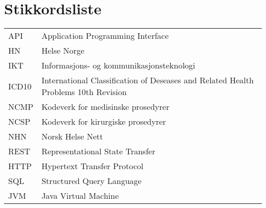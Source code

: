 \section{Stikkordsliste}

\begin{table}[H]
\begin{tabular}{l l} 
 
API & Application Programming Interface\\
  
HN & Helse Norge\\
IKT & Informasjons- og kommunikasjonsteknologi\\
ICD10 & International Classification of Deseases and Related Health Problems 10th Revision\\
NCMP & Kodeverk for medisinske prosedyrer\\
NCSP & Kodeverk for kirurgiske prosedyrer\\
NHN & Norsk Helse Nett\\
REST & Representational State Transfer\\
HTTP & Hypertext Transfer Protocol\\
SQL & Structured Query Language\\
JVM & Java Virtual Machine\\

 
\end{tabular}
\end{table}